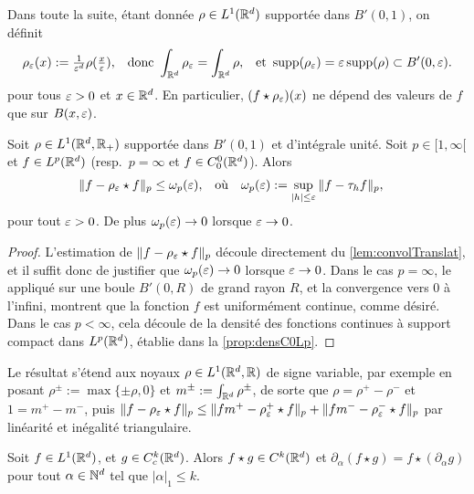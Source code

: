 Dans toute la suite, étant donnée $\rho \in L^1(\mathbb{R}^d)$ supportée dans $B'(0,1)$, on définit 
\begin{align*}
	\rho_\varepsilon(x) &:= \tfrac 1 {\varepsilon^d} \rho(\tfrac x {\varepsilon}), &
	\text{donc } \int_{\mathbb{R}^d} \rho_\varepsilon &= \int_{\mathbb{R}^d} \rho, &
	\text{et } \operatorname{supp}(\rho_\varepsilon) =  \varepsilon \operatorname{supp}(\rho) \subset B'(0,\varepsilon).
\end{align*}
pour tous $\varepsilon>0$ et $x\in \mathbb{R}^d$. En particulier, $(f\star \rho_\varepsilon) (x)$ ne dépend des valeurs de $f$ que sur $B(x,\varepsilon)$. 

\begin{proposition}
\label{prop:convolApprox}
%
Soit $\rho \in L^1(\mathbb{R}^d,\mathbb{R}_+)$ supportée dans $B'(0,1)$ et d'intégrale unité. 
Soit $p\in [1,\infty[$ et $f \in L^p(\mathbb{R}^d)$ (resp.\ $p=\infty$ et $f\in C^0_0(\mathbb{R}^d)$). Alors 
\begin{align*}
\|f-\rho_\varepsilon\star f\|_{p} &\leq \omega_p(\varepsilon),& \text{où}\quad
\omega_p(\varepsilon) &:= \sup_{|h| \leq \varepsilon} \|f-\tau_h f\|_{p},
\end{align*}
pour tout $\varepsilon>0$. De plus $\omega_p(\varepsilon)\to 0$ lorsque $\varepsilon\to 0$.
\end{proposition}

\begin{proof} 
L'estimation de $\|f-\rho_\varepsilon \star f\|_p$ découle directement du \cref{lem:convolTranslat}, et il suffit donc de justifier que $\omega_p(\varepsilon)\to 0$ lorsque $\varepsilon\to 0$.
Dans le cas $p=\infty$, le  appliqué sur une boule $B'(0,R)$ de grand rayon $R$, et la convergence vers $0$ à l'infini, montrent que la fonction $f$ est uniformément continue, comme désiré.
Dans le cas $p<\infty$, cela découle de la densité des fonctions continues à support compact dans $L^p(\mathbb{R}^d)$, établie dans la \cref{prop:densC0Lp}.
\end{proof}

Le résultat s'étend aux noyaux $\rho\in L^1(\mathbb{R}^d,\mathbb{R})$ de signe variable, par exemple en posant $\rho^\pm := \max \{\pm \rho, 0\}$ et $m^\pm := \int_{\mathbb{R}^d} \rho^{\pm}$, de sorte que $\rho = \rho^+-\rho^-$ et $1 = m^+-m^-$, puis $\|f - \rho_\varepsilon \star f \|_p \leq \|f m^+ - \rho^+_\varepsilon \star f\|_p + \|f m^- - \rho^-_\varepsilon \star f\|_p$ par linéarité et inégalité triangulaire.

\begin{proposition}
\label{prop:convolDeriv}
%
Soit $f \in L^1(\mathbb{R}^d)$, et $g \in C^k_c(\mathbb{R}^d)$. Alors $f\star g \in C^k(\mathbb{R}^d)$ et $\partial_\alpha (f\star g) = f \star (\partial_\alpha g)$ pour tout $\alpha \in \mathbb{N}^d$ tel que $|\alpha|_1 \leq k$. 
\end{proposition}

